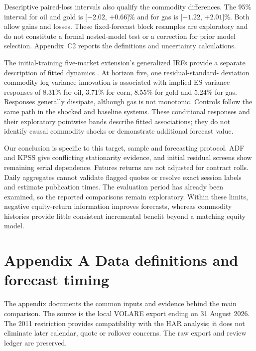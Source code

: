 \documentclass[11pt,letterpaper]{article}
\begin{document}
Descriptive paired-loss intervals also qualify the commodity differences.
The 95\% interval for oil and gold is [\(-2.02\), \(+0.66\)]\% and for gas is
[\(-1.22\), \(+2.01\)]\%. Both allow gains and losses. These fixed-forecast block
resamples are exploratory and do not constitute a formal nested-model test or a
correction for prior model selection. Appendix~C2 reports the
definitions and uncertainty calculations.

The initial-training five-market extension's generalized IRFs provide a separate
description of fitted dynamics \cite{pesaran}. At horizon five, one residual-standard-
deviation commodity log-variance innovation is associated with implied ES variance
responses of 8.31\% for oil, 3.71\% for corn, 8.55\% for gold and 5.24\% for gas.
Responses generally dissipate, although gas is not monotonic. Controls follow the
same path in the shocked and baseline systems. These conditional responses and
their exploratory pointwise bands describe fitted associations; they do not
identify causal commodity shocks or demonstrate additional forecast value.

Our conclusion is specific to this target, sample and forecasting protocol.
ADF and KPSS give conflicting stationarity evidence, and initial residual screens
show remaining serial dependence. Futures returns are not adjusted for contract
rolls. Daily aggregates cannot validate flagged quotes or resolve exact session
labels and estimate publication times. The evaluation period has already been
examined, so the reported comparisons remain exploratory. Within these limits,
negative equity-return information improves forecasts, whereas commodity histories
provide little consistent incremental benefit beyond a matching equity model.

\clearpage
\appendix
\setcounter{table}{0}
\setcounter{figure}{0}
\section*{Appendix A Data definitions and forecast timing}\label{app:data}
The appendix documents the common inputs and evidence behind the main comparison.
The source is the local VOLARE export ending on 31 August 2026. The 2011 restriction
provides compatibility with the HAR analysis; it does not eliminate later calendar,
quote or rollover concerns. The raw export and review ledger are preserved.
\end{document}
